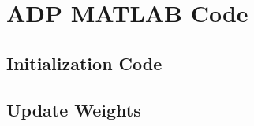 \chapter{ADP MATLAB Code}
\label{ch: AppendixE}

\section{Initialization Code}
\label{ch:RPI3_SPI_Int}


\section{Update Weights}
\label{ch:RPI3_SPI_Int}



